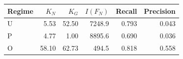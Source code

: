 \begin{tabular}{lrrrrr}\toprule
	Regime & $K_N$ & $K_G$ & $I(F_N)$ & Recall & Precision\\\midrule
	U & 5.53 & 52.50 & 7248.9 & 0.793 & 0.043\\
	P & 4.77 & 1.00 & 8895.6 & 0.690 & 0.036\\
	O & 58.10 & 62.73 & 494.5 & 0.818 & 0.558\\
	\bottomrule
\end{tabular}
